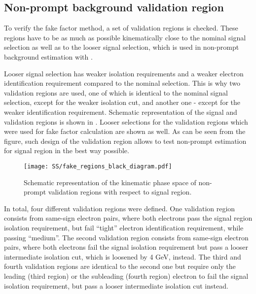 \subsection{Non-prompt background validation region}

To verify the fake factor method, a set of validation regions is checked. 
These regions have to be as much as possible kinematically close to
the nominal signal selection as well as to the looser signal selection, 
which is used in non-prompt background estimation with .

Looser signal selection has weaker isolation requirements and a weaker 
electron identification requirement compared to the nominal selection.
This is why two validation regions are used, one of which is identical
to the nominal signal selection, except for the weaker isolation cut, and another
one - except for the weaker identification requirement. 
Schematic representation of the signal and validation regions is shown
in . 
Looser selections for the
validation regions which were used for fake factor calculation are shown
as well. As can be seen from the figure, such design of the validation
region allows to test non-prompt estimation for signal region in the 
best way possible.

\begin{figure}[h]
\begin{center}
\texttt{[image: SS/fake\_regions\_black\_diagram.pdf]}
\caption{Schematic representation of the kinematic phase space of non-prompt validation regions with respect to signal region.}
\label{fig:fake_validation_regions}
\end{center}
\end{figure}

In total, four different validation regions were defined.
One validation region consists from same-sign electron pairs, where both electrons pass the signal region isolation requirement, 
but fail ``tight'' electron identification requirement, while passing ``medium''.
The second validation region consists from same-sign electron pairs, where both electrons fail the signal isolation requirement
but pass a looser intermediate isolation cut, which is loosened by 4 GeV, instead.
The third and fourth validation regions are identical to the second one but require only the leading (third region) or the subleading (fourth region)
electron to fail the signal isolation requirement, but pass a looser intermediate isolation cut instead.

